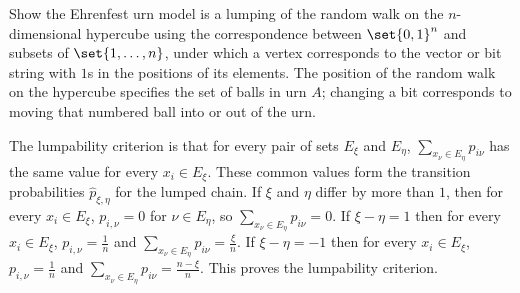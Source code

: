 \documentclass[12pt]{article}
\begin{document}
\begin{exercise}
    Show the Ehrenfest urn model is a lumping of the random walk on the \(
    n \)-dimensional hypercube using the correspondence between \( \set{0,1}^n
    \) and subsets of \( \set{1, \dots, n} \), under which a vertex
    corresponds to the vector or bit string with \( 1 \)s in the
    positions of its elements.  The position of the random walk on the
    hypercube specifies the set of balls in urn \( A \); changing a bit
    corresponds to moving that numbered ball into or out of the urn.
\end{exercise}
\begin{solution}
    The lumpability criterion is that for every pair of sets \( E_{\xi} \)
    and \( E_{\eta} \), \( \sum_{x_{\nu} \in E_{\eta}} p_{i\nu} \) has
    the same value for every \( x_i \in E_{\xi} \).  These common values
    form the transition probabilities \( \hat{p}_{\xi,\eta} \) for the
    lumped chain.  If \( \xi \) and \( \eta \) differ by more than \( 1 \),
    then for every \( x_i \in E_{\xi} \), \( p_{i,\nu} = 0 \) for \( \nu
    \in E_{\eta} \), so \( \sum_{x_{\nu} \in E_{\eta}} p_{i\nu} = 0 \).
    If \( \xi - \eta = 1 \) then for every \( x_i \in E_{\xi} \), \( p_{i,\nu}
    = \frac{1}{n} \) and \( \sum_{x_{\nu} \in E_{\eta}} p_{i\nu} = \frac
    {\xi}{n} \).  If \( \xi - \eta = -1 \) then for every \( x_i \in E_
    {\xi} \), \( p_{i,\nu} = \frac{1}{n} \) and \( \sum_{x_{\nu} \in E_{\eta}}
    p_{i\nu} = \frac{n-\xi}{n} \).  This proves the lumpability
    criterion.
\end{solution}
\end{document}
